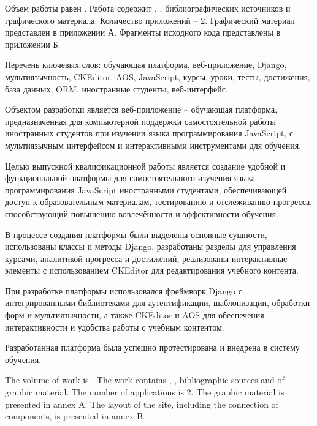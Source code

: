 
Объем работы равен . Работа содержит , ,  библиографических источников и  графического материала. Количество приложений – 2. Графический материал представлен в приложении А. Фрагменты исходного кода представлены в приложении Б.

Перечень ключевых слов: обучающая платформа, веб-приложение, Django, мультиязычность, CKEditor, AOS, JavaScript, курсы, уроки, тесты, достижения, база данных, ORM, иностранные студенты, веб-интерфейс.

Объектом разработки является веб-приложение -- обучающая платформа, предназначенная для компьютерной поддержки самостоятельной работы иностранных студентов при изучении языка программирования JavaScript, с мультиязычным интерфейсом и интерактивными инструментами для обучения.

Целью выпускной квалификационной работы является создание удобной и функциональной платформы для самостоятельного изучения языка программирования JavaScript иностранными студентами, обеспечивающей доступ к образовательным материалам, тестированию и отслеживанию прогресса, способствующий повышению вовлечённости и эффективности обучения.

В процессе создания платформы были выделены основные сущности, использованы классы и методы Django, разработаны разделы для управления курсами, аналитикой прогресса и достижений, реализованы интерактивные элементы с использованием CKEditor для редактирования учебного контента.

При разработке платформы использовался фреймворк Django с интегрированными библиотеками для аутентификации, шаблонизации, обработки форм и мультиязычности, а также CKEditor и AOS для обеспечения интерактивности и удобства работы с учебным контентом.

Разработанная платформа была успешно протестирована и внедрена в систему обучения.

  
The volume of work is . The work contains , ,  bibliographic sources and  of graphic material. The number of applications is 2. The graphic material is presented in annex A. The layout of the site, including the connection of components, is presented in annex B.

